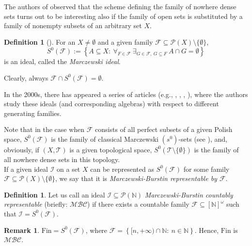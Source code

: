 \documentclass{amsart}
\theoremstyle{definition}
\newtheorem{df}[thm]{Definition}
\newtheorem{remark}[thm]{Remark}
\newcommand{\N}{{\mathbb N}}
\newcommand{\Fin}{\textrm{Fin}}
\newcommand{\I}{\mathcal I}
\newcommand{\T}{\mathcal{T}}
\newcommand{\InfSubs}{[\N]^{\omega}}
\newcommand{\MB}{S^0}
\newcommand{\MBC}{\mathcal{MBC}}
\begin{document}
The authors of \cite{MB} observed that the scheme defining the family of nowhere dense sets turns out to be interesting also if the family of open sets is substituted by a family of nonempty subsets of an arbitrary set $X$.

\begin{df}[\cite{MB}] 
For an $X\neq\emptyset$ and a given family $\mathcal{F}\subseteq \mathcal{P}(X)\setminus\{\emptyset\}$,
$$\MB(\mathcal{F}) := \left\{A\subseteq X :\ \forall_{F\in\mathcal{F}}\ \exists_{G\in\mathcal{F},\ G\subseteq F}\ A\cap G=\emptyset\right\}$$
is an ideal, called the \emph{Marczewski ideal}.
\end{df}

Clearly, always $\mathcal{F}\cap \MB(\mathcal{F})=\emptyset$.

In the 2000s, there has appeared a series of articles (e.g., \cite{MB}, \cite{MB2}, \cite{MB3}, \cite{MB4}), where the authors study these ideals (and corresponding algebras) with respect to different generating families.

Note that in the case when $\mathcal{F}$ consists of all perfect subsets of a given Polish space, $\MB(\mathcal{F})$ is the family of classical Marczewski $(s^0)$-sets (see \cite{Sz}), and, obviously, if $(X,\T)$ is a given topological space, $\MB(\T\setminus\{\emptyset\})$ is the family of all nowhere dense sets in this topology.\\


If a given ideal $\I$ on a set $X$ can be represented as $\MB(\mathcal{F})$ for some family $\mathcal{F}\subseteq \mathcal{P}(X)\setminus\{\emptyset\}$, we say that it is \emph{Marczewski-Burstin representable by $\mathcal{F}$}. 

\begin{df}
Let us call an ideal $\I\subseteq \mathcal{P}(\N)$ \emph{Marczewski-Burstin countably representable} (briefly: $\MBC$) if there exists a countable family $\mathcal{F}\subseteq \InfSubs$ such that $\I = \MB(\mathcal{F})$.
\end{df}

\begin{remark} 
$\Fin = \MB(\mathcal{F})$, where $\mathcal{F}= \left\{[n, +\infty)\cap\N :\ n\in\N\right\}$. Hence, $\Fin$ is $\MBC$.
\end{remark}
\end{document}
